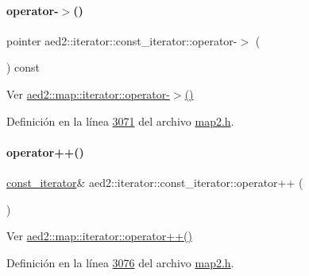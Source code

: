 \paragraph{\texorpdfstring{operator-\/$>$()}{operator->()}}
{\footnotesize\ttfamily pointer aed2\+::iterator\+::const\+\_\+iterator\+::operator-\/$>$ (\begin{DoxyParamCaption}{ }\end{DoxyParamCaption}) const\hspace{0.3cm}{\ttfamily [inline]}}



Ver \hyperlink{classaed2_1_1map_1_1iterator_a712522d62f461c1eb9b02ecf248bae8c_a712522d62f461c1eb9b02ecf248bae8c}{aed2\+::map\+::iterator\+::operator-\/$>$()} 



Definición en la línea \hyperlink{map2_8h_source_l03071}{3071} del archivo \hyperlink{map2_8h_source}{map2.\+h}.

\mbox{\label{classaed2_1_1iterator_1_1const__iterator_acf3320ad50b0c151117e2384ec784330_acf3320ad50b0c151117e2384ec784330}} 
\paragraph{\texorpdfstring{operator++()}{operator++()}\hspace{0.1cm}{\footnotesize\ttfamily [1/2]}}
{\footnotesize\ttfamily \hyperlink{classaed2_1_1iterator_1_1const__iterator}{const\+\_\+iterator}\& aed2\+::iterator\+::const\+\_\+iterator\+::operator++ (\begin{DoxyParamCaption}{ }\end{DoxyParamCaption})\hspace{0.3cm}{\ttfamily [inline]}}



Ver \hyperlink{classaed2_1_1map_1_1iterator_a7c44de7f0508186e135ddbcfe782fec5_a7c44de7f0508186e135ddbcfe782fec5}{aed2\+::map\+::iterator\+::operator++()} 



Definición en la línea \hyperlink{map2_8h_source_l03076}{3076} del archivo \hyperlink{map2_8h_source}{map2.\+h}.


